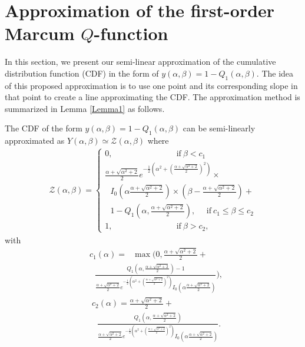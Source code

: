 \section{Approximation of the first-order Marcum $Q$-function}
In this section, we present our semi-linear approximation of the cumulative distribution function (CDF) in the form of $y(\alpha, \beta ) = 1-Q_1(\alpha,\beta)$. The idea of this proposed approximation is to use one point and its corresponding slope in that point to create a line  approximating the CDF. The approximation method is summarized in Lemma \ref{Lemma1} as follows.
\begin{lem}\label{Lemma1}
 The CDF of the form $y(\alpha, \beta ) = 1-Q_1(\alpha,\beta)$ can be semi-linearly approximated as $Y(\alpha,\beta)\simeq \mathcal{Z}(\alpha, \beta)$ where
\begin{align}\label{eq_lema1}
\mathcal{Z}(\alpha, \beta)=
\begin{cases}
0,  ~~~~~~~~~~~~~~~~~~~~~~~~~~~~~~~~~~~\mathrm{if}~ \beta < c_1  \\ 
 \frac{\alpha+\sqrt{\alpha^2+2}}{2} e^{-\frac{1}{2}\left(\alpha^2+\left(\frac{\alpha+\sqrt{\alpha^2+2}}{2}\right)^2\right)}\times\\
 ~~~I_0\left(\alpha\frac{\alpha+\sqrt{\alpha^2+2}}{2}\right)\times\left(\beta-\frac{\alpha+\sqrt{\alpha^2+2}}{2}\right)+\\
 ~~~1-Q_1\left(\alpha,\frac{\alpha+\sqrt{\alpha^2+2}}{2}\right),  ~~~~~~\mathrm{if}~ c_1 \leq\beta\leq c_2 \\
1,  ~~~~~~~~~~~~~~~~~~~~~~~~~~~~~~~~~~~\mathrm{if}~ \beta> c_2,
\end{cases}
\end{align}
with
\begin{align}\label{eq_c1}
   & c_1(\alpha) =~~~ \max\Bigg(0,\frac{\alpha+\sqrt{\alpha^2+2}}{2}+\nonumber\\
    &~~~\frac{Q_1\left(\alpha,\frac{\alpha+\sqrt{\alpha^2+2}}{2}\right)-1}{\frac{\alpha+\sqrt{\alpha^2+2}}{2} e^{-\frac{1}{2}\left(\alpha^2+\left(\frac{\alpha+\sqrt{\alpha^2+2}}{2}\right)^2\right)}I_0\left(\alpha\frac{\alpha+\sqrt{\alpha^2+2}}{2}\right)}\Bigg),
\end{align}
\begin{align}\label{eq_c2}
   & c_2(\alpha) = \frac{\alpha+\sqrt{\alpha^2+2}}{2}+\nonumber\\
   & ~~~\frac{Q_1\left(\alpha,\frac{\alpha+\sqrt{\alpha^2+2}}{2}\right)}{\frac{\alpha+\sqrt{\alpha^2+2}}{2} e^{-\frac{1}{2}\left(\alpha^2+\left(\frac{\alpha+\sqrt{\alpha^2+2}}{2}\right)^2\right)}I_0\left(\alpha\frac{\alpha+\sqrt{\alpha^2+2}}{2}\right)}.
\end{align}
\end{lem}
